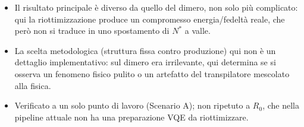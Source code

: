 \documentclass[11pt,a4paper]{article}
\begin{document}
\begin{itemize}[leftmargin=1.6em,itemsep=3pt]
\item Il risultato principale è diverso da quello del dimero, non solo più
complicato: qui la riottimizzazione produce un compromesso energia/fedeltà
reale, che però non si traduce in uno spostamento di $N^*$ a valle.
\item La scelta metodologica (struttura fissa contro produzione) qui non è
un dettaglio implementativo: sul dimero era irrilevante, qui determina se
si osserva un fenomeno fisico pulito o un artefatto del transpilatore
mescolato alla fisica.
\item Verificato a un solo punto di lavoro (Scenario A); non ripetuto a
$R_0$, che nella pipeline attuale non ha una preparazione VQE da
riottimizzare.
\end{itemize}
\end{document}
